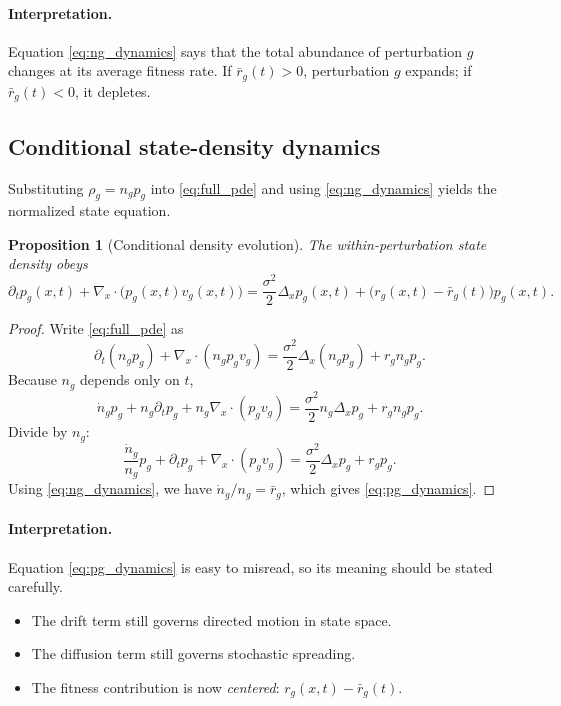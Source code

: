 \documentclass[11pt]{article}
\newcommand{\1}{\mathbf{1}}
\theoremstyle{plain}
\newtheorem{proposition}{Proposition}
\begin{document}
\paragraph{Interpretation.}
Equation \eqref{eq:ng_dynamics} says that the total abundance of perturbation $g$ changes at its average fitness rate. If $\bar r_g(t)>0$, perturbation $g$ expands; if $\bar r_g(t)<0$, it depletes.

\subsection{Conditional state-density dynamics}

Substituting $\rho_g=n_gp_g$ into \eqref{eq:full_pde} and using \eqref{eq:ng_dynamics} yields the normalized state equation.

\begin{proposition}[Conditional density evolution]
The within-perturbation state density obeys
\begin{equation}
\partial_t p_g(x,t)
+
\nabla_x\cdot\big(p_g(x,t)v_g(x,t)\big)
=
\frac{\sigma^2}{2}\Delta_x p_g(x,t)
+
\big(r_g(x,t)-\bar r_g(t)\big)p_g(x,t).
\label{eq:pg_dynamics}
\end{equation}
\end{proposition}

\begin{proof}
Write \eqref{eq:full_pde} as
\[
\partial_t(n_gp_g)+\nabla_x\cdot(n_gp_g v_g)=\frac{\sigma^2}{2}\Delta_x(n_gp_g)+r_g n_gp_g.
\]
Because $n_g$ depends only on $t$,
\[
\dot n_g p_g+n_g\partial_t p_g+n_g\nabla_x\cdot(p_gv_g)=\frac{\sigma^2}{2}n_g\Delta_x p_g+r_g n_gp_g.
\]
Divide by $n_g$:
\[
\frac{\dot n_g}{n_g}p_g+\partial_t p_g+\nabla_x\cdot(p_gv_g)=\frac{\sigma^2}{2}\Delta_x p_g+r_g p_g.
\]
Using \eqref{eq:ng_dynamics}, we have $\dot n_g/n_g=\bar r_g$, which gives \eqref{eq:pg_dynamics}.
\end{proof}

\paragraph{Interpretation.}
Equation \eqref{eq:pg_dynamics} is easy to misread, so its meaning should be stated carefully.
\begin{itemize}
    \item The drift term still governs directed motion in state space.
    \item The diffusion term still governs stochastic spreading.
    \item The fitness contribution is now \emph{centered}: $r_g(x,t)-\bar r_g(t)$.
\end{itemize}
\end{document}
